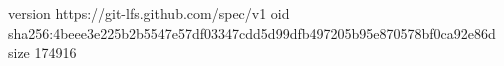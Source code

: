 version https://git-lfs.github.com/spec/v1
oid sha256:4beee3e225b2b5547e57df03347cdd5d99dfb497205b95e870578bf0ca92e86d
size 174916
